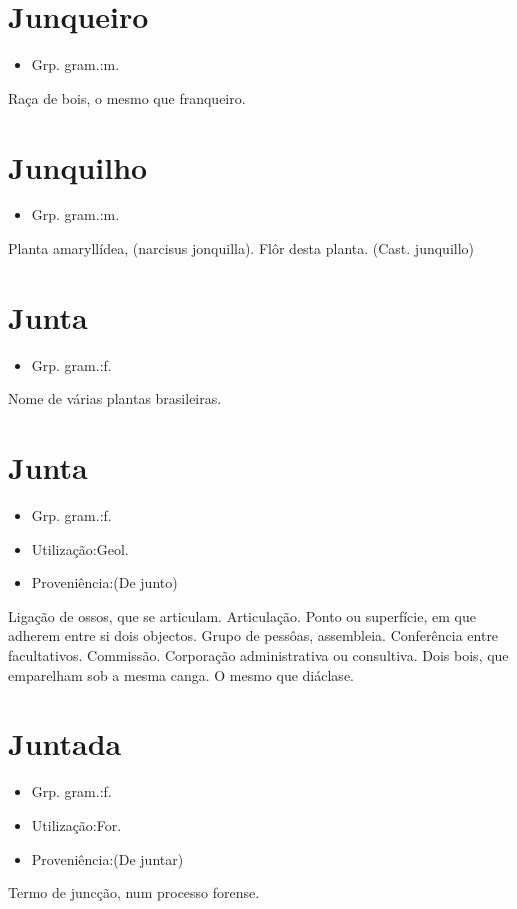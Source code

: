 \documentclass{article}
\begin{document}
\section{Junqueiro}
\begin{itemize}
\item {Grp. gram.:m.}
\end{itemize}
Raça de bois, o mesmo que \textunderscore franqueiro\textunderscore .
\section{Junquilho}
\begin{itemize}
\item {Grp. gram.:m.}
\end{itemize}
Planta amaryllídea, (\textunderscore narcisus jonquilla\textunderscore ).
Flôr desta planta.
(Cast. \textunderscore junquillo\textunderscore )
\section{Junta}
\begin{itemize}
\item {Grp. gram.:f.}
\end{itemize}
Nome de várias plantas brasileiras.
\section{Junta}
\begin{itemize}
\item {Grp. gram.:f.}
\end{itemize}
\begin{itemize}
\item {Utilização:Geol.}
\end{itemize}
\begin{itemize}
\item {Proveniência:(De \textunderscore junto\textunderscore )}
\end{itemize}
Ligação de ossos, que se articulam.
Articulação.
Ponto ou superfície, em que adherem entre si dois objectos.
Grupo de pessôas, assembleia.
Conferência entre facultativos.
Commissão.
Corporação administrativa ou consultiva.
Dois bois, que emparelham sob a mesma canga.
O mesmo que \textunderscore diáclase\textunderscore .
\section{Juntada}
\begin{itemize}
\item {Grp. gram.:f.}
\end{itemize}
\begin{itemize}
\item {Utilização:For.}
\end{itemize}
\begin{itemize}
\item {Proveniência:(De \textunderscore juntar\textunderscore )}
\end{itemize}
Termo de juncção, num processo forense.
\end{document}
